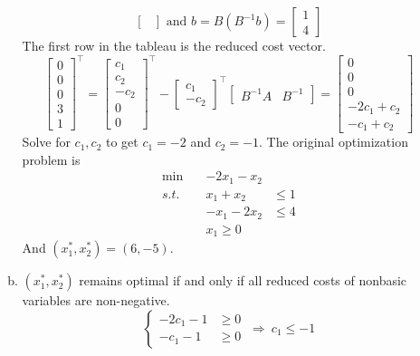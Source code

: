 \begin{enumerate}
\begin{enumerate}[(a)]
\[\begin{bmatrix}
		\end{bmatrix} \text{ and } b = B(B^{-1}b)=\begin{bmatrix}
		1\\4
		\end{bmatrix}
		\]
		The first row in the tableau is the reduced cost vector.
		\[
		\begin{bmatrix}
		0\\0\\0\\3\\1
		\end{bmatrix}^\top = \begin{bmatrix}
		c_1\\c_2\\-c_2\\0\\0
		\end{bmatrix}^\top - \begin{bmatrix}
		c_1 \\ -c_2
		\end{bmatrix}^\top \begin{bmatrix}
		B^{-1}A & B^{-1}
		\end{bmatrix} = \begin{bmatrix}
		0 \\ 0\\ 0\\ -2c_1+c_2\\-c_1+c_2
		\end{bmatrix}
		\]
		Solve for $c_1,c_2$ to get $c_1 = -2$ and $c_2=-1$. The original optimization problem is
		\[
		\begin{aligned}
		\min \quad & -2x_1-x_2\\
		s.t. \quad &x_1 + x_2 &\le 1 \\
		&-x_1 -2x_2 &\le 4\\
		&x_1\ge 0
		\end{aligned}
		\]
		And $(x_1^*, x_2^*) = (6,-5)$.
		\newpage
		
		\item $(x_1^*, x_2^*)$ remains optimal if and only if all reduced costs of nonbasic variables are non-negative. 
		\[\left\{
		\begin{aligned}
		-2c_1 -1 &\ge 0\\
		-c_1 -1 &\ge 0 
		\end{aligned}\right. ~\Rightarrow~ c_1 \le -1
		\]
		

\end{enumerate}
\end{enumerate}
